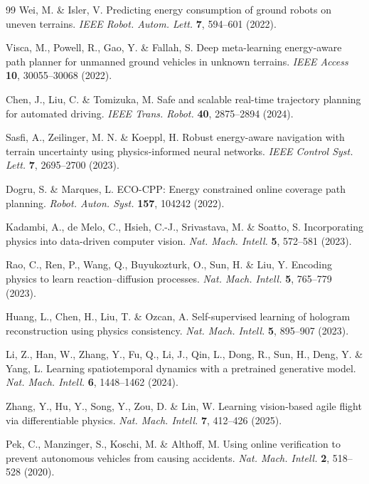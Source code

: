 \documentclass[pdflatex,sn-nature]{sn-jnl}%
\begin{document}
\begin{thebibliography}{99}
Wei, M. \& Isler, V. Predicting energy consumption of ground robots on uneven terrains.
\textit{IEEE Robot. Autom. Lett.} \textbf{7}, 594--601 (2022).

Visca, M., Powell, R., Gao, Y. \& Fallah, S. Deep meta-learning energy-aware path planner for unmanned ground vehicles in unknown terrains.
\textit{IEEE Access} \textbf{10}, 30055--30068 (2022).


Chen, J., Liu, C. \& Tomizuka, M. Safe and scalable real-time trajectory planning for automated driving.
\textit{IEEE Trans. Robot.} \textbf{40}, 2875--2894 (2024).

Sasfi, A., Zeilinger, M. N. \& Koeppl, H. Robust energy-aware navigation with terrain uncertainty using physics-informed neural networks.
\textit{IEEE Control Syst. Lett.} \textbf{7}, 2695--2700 (2023).

Dogru, S. \& Marques, L. ECO-CPP: Energy constrained online coverage path planning.
\textit{Robot. Auton. Syst.} \textbf{157}, 104242 (2022).


Kadambi, A., de Melo, C., Hsieh, C.-J., Srivastava, M. \& Soatto, S. Incorporating physics into data-driven computer vision. \textit{Nat. Mach. Intell.} \textbf{5}, 572--581 (2023).

Rao, C., Ren, P., Wang, Q., Buyukozturk, O., Sun, H. \& Liu, Y. Encoding physics to learn reaction--diffusion processes. \textit{Nat. Mach. Intell.} \textbf{5}, 765--779 (2023).

Huang, L., Chen, H., Liu, T. \& Ozcan, A. Self-supervised learning of hologram reconstruction using physics consistency. \textit{Nat. Mach. Intell.} \textbf{5}, 895--907 (2023).

Li, Z., Han, W., Zhang, Y., Fu, Q., Li, J., Qin, L., Dong, R., Sun, H., Deng, Y. \& Yang, L. Learning spatiotemporal dynamics with a pretrained generative model. \textit{Nat. Mach. Intell.} \textbf{6}, 1448--1462 (2024).

Zhang, Y., Hu, Y., Song, Y., Zou, D. \& Lin, W. Learning vision-based agile flight via differentiable physics. \textit{Nat. Mach. Intell.} \textbf{7}, 412--426 (2025).

Pek, C., Manzinger, S., Koschi, M. \& Althoff, M. Using online verification to prevent autonomous vehicles from causing accidents. \textit{Nat. Mach. Intell.} \textbf{2}, 518--528 (2020).


\end{thebibliography}
\end{document}
